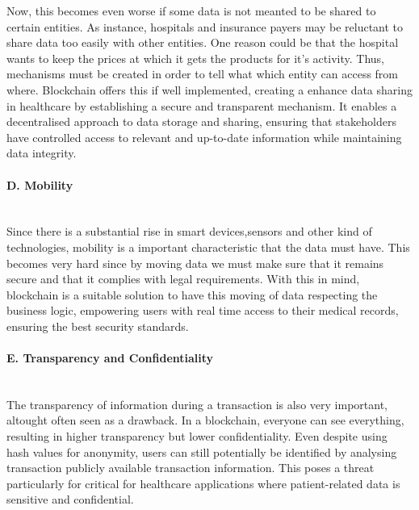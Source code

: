 Now, this becomes even worse if some data is not meanted to be shared to certain entities. As instance, hospitals and insurance payers may be reluctant to share data too easily with other entities. One reason could be that the hospital wants to keep the prices at which it gets the products for it's activity. Thus, mechanisms must be created in order to tell what which entity can access from where. Blockchain offers this if well implemented, creating a enhance data sharing in healthcare by establishing a secure and transparent mechanism. It enables a decentralised approach to data storage and sharing, ensuring that stakeholders have controlled access to relevant and up-to-date information while maintaining data integrity.

\paragraph{D. Mobility} \mbox{}\\
Since there is a substantial rise in smart devices,sensors and other kind of technologies, mobility is a important characteristic that the data must have. This becomes very hard since by moving data we must make sure that it remains secure and that it complies with legal requirements. With this in mind, blockchain is a suitable solution to have this moving of data respecting the business logic, empowering users with real time access to their medical records, ensuring the best security standards.

\paragraph{E. Transparency and Confidentiality} \mbox{}\\
The transparency of information during a transaction is also very important, altought often seen as a drawback. In a blockchain, everyone can see everything, resulting in higher transparency but lower confidentiality. Even  despite using hash values for anonymity, users can still potentially be identified by analysing transaction publicly available transaction information. This poses a threat particularly for critical for healthcare applications where patient-related data is sensitive and confidential.

